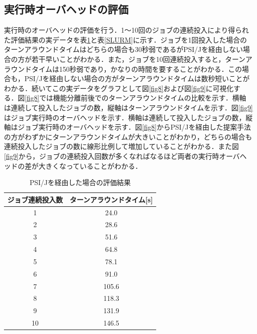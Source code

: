 \subsection{実行時オーバヘッドの評価}
実行時のオーバヘッドの評価を行う．1～10回のジョブの連続投入により得られた評価結果の実データを表\ref{PSIJ}と表\ref{SLURM}に示す．ジョブを1回投入した場合のターンアラウンドタイムはどちらの場合も30秒弱であるがPSI/Jを経由しない場合の方が若干早いことがわかる．また，ジョブを10回連続投入すると，ターンアラウンドタイムは150秒弱であり，かなりの時間を要することがわかる．この場合も，PSI/Jを経由しない場合の方がターンアラウンドタイムは数秒短いことがわかる．続いてこの実データをグラフとして図\ref{fig8}および図\ref{fig9}に可視化する．図\ref{fig8}では機能分離前後でのターンアラウンドタイムの比較を示す．横軸は連続して投入したジョブの数，縦軸はターンアラウンドタイムを示す．図\ref{fig9}はジョブ実行時のオーバヘッドを示す．横軸は連続して投入したジョブの数，縦軸はジョブ実行時のオーバヘッドを示す．図\ref{fig8}からPSI/Jを経由した提案手法の方がわずかにターンアラウンドタイムが大きいことがわかり，どちらの場合も連続投入したジョブの数に線形比例して増加していることがわかる．また図\ref{fig9}から，ジョブの連続投入回数が多くなればなるほど両者の実行時オーバヘッドの差が大きくなっていることがわかる．\par

\begin{table}[tb]
    \centering
    \caption{PSI/Jを経由した場合の評価結果}
    \begin{tabular}{|c|c|}
    \hline
    ジョブ連続投入数 & ターンアラウンドタイム{[}s{]} \\ \hline
    1        & 24.0               \\ \hline
    2        & 28.6               \\ \hline
    3        & 51.6               \\ \hline
    4        & 64.8               \\ \hline
    5        & 78.1               \\ \hline
    6        & 91.0               \\ \hline
    7        & 105.6              \\ \hline
    8        & 118.3              \\ \hline
    9        & 131.9              \\ \hline
    10       & 146.5              \\ \hline
    \end{tabular}
    \label{PSIJ}
\end{table}

